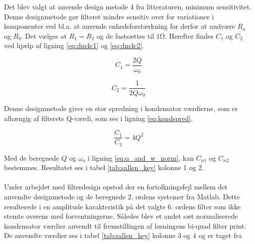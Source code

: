 Det blev valgt at anvende design metode 4 fra litteraturen, minimum sensitivitet.
Denne designmetode gør filteret mindre sensitiv over for variationer i komponenter ved bl.a.
at anvende enhedsforstærkning for derfor at undvære $R_a$ og $R_b$.
Det vælges at $R_1 = R_2$ og de fastsættes til $1\si{\ohm}$. Herefter findes $C_1$ og $C_2$ ved hjælp af ligning \ref{eq:dm4c1} og \ref{eq:dm4c2}.

\vspace{15pt}

\begin{minipage}{0.5\linewidth}
	\begin{equation}
	\label{eq:dm4c1}
	C_1 = \frac{2Q}{\omega_0}
	\end{equation}
\end{minipage}
\begin{minipage}{0.5\linewidth}
	\begin{equation}
	\label{eq:dm4c2}
	C_2 = \frac{1}{2Q\omega_0}
	\end{equation}
\end{minipage}

\vspace{15pt}

Denne designmetode giver en stor spredning i kondensator værdierne, som er afhængig af filterets Q-værdi, som ses i ligning
\ref{eq:kondspred}.

\begin{equation}
\label{eq:kondspred}
\frac{C_1}{C_2} = 4Q^2
\end{equation}

Med de beregnede $Q$ og $\omega_o$ i ligning \ref{eq:q_and_w_norm}, kan $C_{n1}$ og $C_{n2}$ bestemmes.
Resultatet ses i tabel \ref{tab:sallen_key} kolonne 1 og 2.
\\
\\
Under arbejdet med filterdesign opstod der en fortolkningsfejl mellem det anvendte designmetode og de beregnede 2. ordens systemer fra Matlab.
Dette resulterede i en amplitude karakteristik på det valgte 6. ordens filter som ikke stemte overens med forventningerne.
Således blev et andet sæt normaliserede kondensator værdier anvendt til fremstillingen af løsningens bi-quad filter print.
De anvendte værdier ses i tabel \ref{tab:sallen_key} kolonne 3 og 4 og er taget fra \cite[Table B-2: Capacitor Values for 0.1-dB Chebyshev lowpass Sallen-Key filters, n=6]{sk_data_web}

